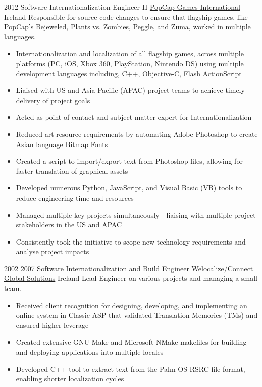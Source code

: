
\begin{twenty}
  {2012}
  {Software Internationalization Engineer II}
  {\href{https://www.popcap.com/}{PopCap Games International}}
  {Ireland}
  {Responsible for source code changes to ensure that flagship games, like PopCap's Bejeweled, Plants vs. Zombies, Peggle, and Zuma, worked in multiple languages.}
  {\begin{itemize}
    \item Internationalization and localization of all flagship games, across multiple platforms (PC, iOS, Xbox 360, PlayStation, Nintendo DS) using multiple development languages including, C++, Objective-C, Flash ActionScript
    \item Liaised with US and Asia-Pacific (APAC) project teams to achieve timely delivery of project goals
    \item Acted as point of contact and subject matter expert for Internationalization
  \end{itemize}
  }
  {\begin{itemize}
    \item Reduced art resource requirements by automating Adobe Photoshop to create Asian language Bitmap Fonts
    \item Created a script to import/export text from Photoshop files, allowing for faster translation of graphical assets
    \item Developed numerous Python, JavaScript, and Visual Basic (VB) tools to reduce engineering time and resources
    \item Managed multiple key projects simultaneously - liaising with multiple project stakeholders in the US and APAC
    \item Consistently took the initiative to scope new technology requirements and analyse project impacts
  \end{itemize}
  }
\end{twenty}

\begin{twenty}
\twentyitem
  {2002}
  {2007}
  {Software Internationalization and Build Engineer}
  {\href{https://www.welocalize.com/}{Welocalize/Connect Global Solutions}}
  {Ireland}
  {Lead Engineer on various projects and managing a small team.}
  {}
  {\begin{itemize}
    \item Received client recognition for designing, developing, and implementing an online system in Classic ASP that validated Translation Memories (TMs) and ensured higher leverage
    \item Created extensive GNU Make and Microsoft NMake makefiles for building and deploying applications into multiple locales
    \item Developed C++ tool to extract text from the Palm OS RSRC file format, enabling shorter localization cycles
  \end{itemize}
  }
\end{twenty}

